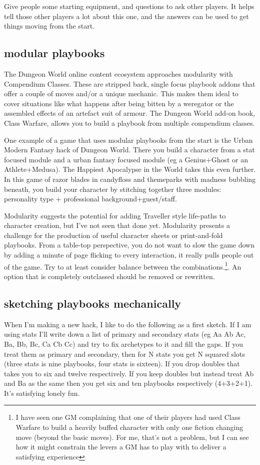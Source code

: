 \documentclass{tufte-handout}
\begin{document}
Give people some starting equipment, and questions to ask other players. It helps tell those other players a lot about this one, and the answers can be used to get things moving from the start.

\subsection{modular playbooks}
The Dungeon World online content ecosystem approaches modularity with Compendium Classes. These are stripped back, single focus playbook addons that offer a couple of moves and/or a unique mechanic. This makes them ideal to cover situations like what happens after being bitten by a weregator or the assembled effects of an artefact suit of armour. The Dungeon World add-on book, Class Warfare, allows you to build a playbook from multiple compendium classes.

One example of a game that uses modular playbooks from the start is the Urban Modern Fantasy hack of Dungeon World. There you build a character from a stat focused module and a urban fantasy focused module (eg a Genius+Ghost or an Athlete+Medusa).  The Happiest Apocalypse in the World takes this even further. In this game of razor blades in candyfloss and themeparks with madness bubbling beneath, you build your character by stitching together three modules: personality type + professional background+guest/staff.

Modularity suggests the potential for adding Traveller style life-paths to character creation, but I've not seen that done yet. Modularity presents a challenge for the production of useful character sheets or print-and-fold playbooks. From a table-top perspective, you do not want to slow the game down by adding a minute of page flicking to every interaction, it really pulls people out of the game. Try to at least consider balance between the combinations.\footnote{I have seen one GM complaining that one of their players had used Class Warfare to build a heavily buffed character with only one fiction changing move (beyond the basic moves). For me, that's not a problem, but I can see how it might constrain the levers a GM has to play with to deliver a satisfying experience}. An option that is completely outclassed should be removed or rewritten. 

\subsection{sketching playbooks mechanically}
When I'm making a new hack, I like to do the following as a first sketch. If I am using stats I'll write down a list of primary and secondary stats (eg Aa Ab Ac, Ba, Bb, Bc, Ca Cb Cc) and try to fix archetypes to it and fill the gaps. If you treat them as primary and secondary, then for N stats you get N squared slots (three stats is nine playbooks, four stats is sixteen). If you drop doubles that takes you to six and twelve respectively. If you keep doubles but instead treat Ab and Ba as the same then you get six and ten playbooks respectively (4+3+2+1). It's satisfying lonely fun. 
\end{document}
